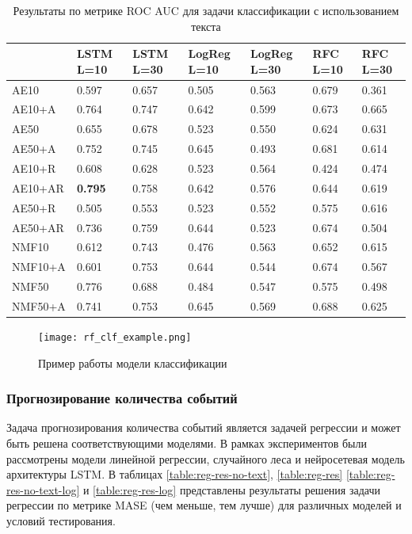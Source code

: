\begin{table}
\centering
\begin{tabular}{||p{3.8cm}|p{1.5cm}|p{1.5cm}|p{1.5cm}|p{1.5cm}|p{1.5cm}|p{1.5cm}||} 
\hline
& LSTM L=10 & LSTM L=30 & LogReg L=10 & LogReg L=30 & RFC L=10 & RFC L=30\\ \hline\hline
AE10 & 0.597 & 0.657 & 0.505 & 0.563 & 0.679 & 0.361\\ \hline
AE10+A & 0.764 & 0.747 & 0.642 & 0.599 & 0.673 & 0.665\\ \hline
AE50 & 0.655 & 0.678 & 0.523 & 0.550 & 0.624 & 0.631\\ \hline
AE50+A & 0.752 & 0.745 & 0.645 & 0.493 & 0.681 & 0.614\\ \hline
AE10+R & 0.608 & 0.628 & 0.523 & 0.564 & 0.424 & 0.474\\ \hline
AE10+AR & \textbf{0.795} & 0.758 & 0.642 & 0.576 & 0.644 & 0.619\\ \hline
AE50+R & 0.505 & 0.553 & 0.523 & 0.552 & 0.575 & 0.616\\ \hline
AE50+AR & 0.736 & 0.759 & 0.644 & 0.523 & 0.674 & 0.504\\ \hline
NMF10 & 0.612 & 0.743 & 0.476 & 0.563 & 0.652 & 0.615\\ \hline
NMF10+A & 0.601 & 0.753 & 0.644 & 0.544 & 0.674 & 0.567\\ \hline
NMF50 & 0.776 & 0.688 & 0.484 & 0.547 & 0.575 & 0.498\\ \hline
NMF50+A & 0.741 & 0.753 & 0.645 & 0.569 & 0.688 & 0.625\\ \hline
 \end{tabular}
\caption{\label{table:clf-res-no-text} Результаты по метрике ROC AUC для задачи классификации с использованием текста}
\label{table:clf_res-text}
\end{table}

\begin{figure}
  \texttt{[image: rf\_clf\_example.png]}
  \caption{Пример работы модели классификации}
  \label{fig:rf_clf_example}
\end{figure}

\subsubsection{Прогнозирование количества событий}
Задача прогнозирования количества событий является задачей регрессии и может быть решена соответствующими моделями. В рамках экспериментов были рассмотрены модели линейной регрессии, случайного леса и нейросетевая модель архитектуры LSTM.
В таблицах \ref{table:reg-res-no-text}, \ref{table:reg-res} \ref{table:reg-res-no-text-log} и \ref{table:reg-res-log} представлены результаты решения задачи регрессии по метрике MASE (чем меньше, тем лучше) для различных моделей и условий тестирования.


